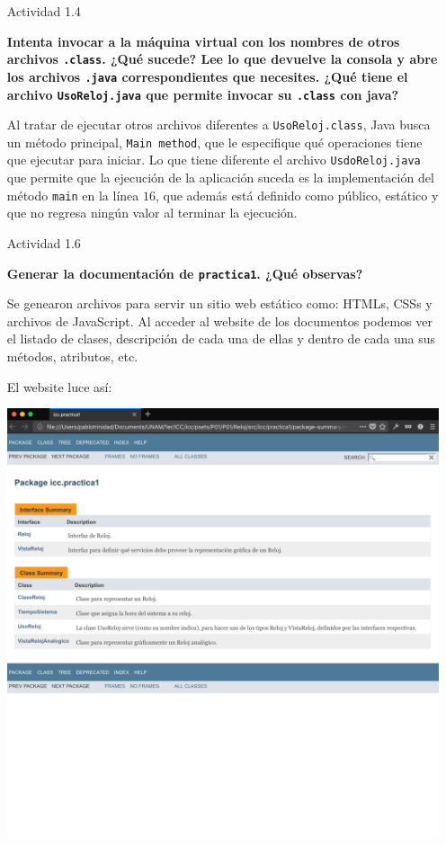 \documentclass[11pt,letterpaper]{article}
\begin{document}
\begin{enumerate}
    \item [Actividad 1.4] {\bfseries Intenta invocar a la máquina virtual con los
    nombres de otros archivos \texttt{.class}. ¿Qué sucede? Lee lo que devuelve la consola
    y abre los archivos \texttt{.java} correspondientes que necesites. ¿Qué tiene el archivo
    \texttt{UsoReloj.java} que permite invocar su \texttt{.class} con java? \par}

        Al tratar de ejecutar otros archivos diferentes a \texttt{UsoReloj.class}, Java
        busca un método principal, \texttt{Main method}, que le especifique qué operaciones
        tiene que ejecutar para iniciar. Lo que tiene diferente el archivo
        \texttt{UsdoReloj.java} que permite que la ejecución de la aplicación suceda es la
        implementación del método \texttt{main} en la línea $16$, que además está definido
        como público, estático y que no regresa ningún valor al terminar la ejecución.

    \vfill

    \item [Actividad 1.6] {\bfseries Generar la documentación de \texttt{practica1}. ¿Qué observas? \par}

        Se genearon archivos para servir un sitio web estático como: HTMLs, CSSs y archivos de
        \mbox{JavaScript}. Al acceder al website de los documentos podemos ver el listado de clases,
        descripción de cada una de ellas y dentro de cada una sus métodos, atributos, etc.

        El website luce así:

        \includegraphics[scale=.3]{assets/img/1-6.png}

\end{enumerate}
\end{document}
